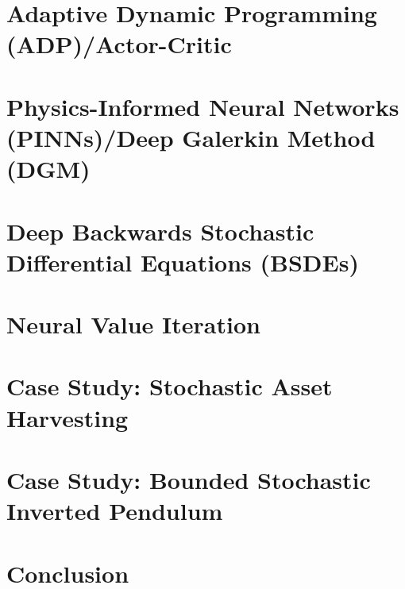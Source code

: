 \documentclass[journal, twoside]{IEEEtran}
\theoremstyle{remark}
\begin{document}
\section{Adaptive Dynamic Programming (ADP)/Actor-Critic}\label{sec:adp}


\section{Physics-Informed Neural Networks (PINNs)/Deep Galerkin Method (DGM)}\label{sec:pinns}


\section{Deep Backwards Stochastic Differential Equations (BSDEs)}\label{sec:bsdes}


\section{Neural Value Iteration}\label{sec:nvi}


\section{Case Study: Stochastic Asset Harvesting}\label{sec:harvest}


\section{Case Study: Bounded Stochastic Inverted Pendulum}\label{sec:pendulum}


\section{Conclusion}\label{sec:conclusion}




\end{document}
